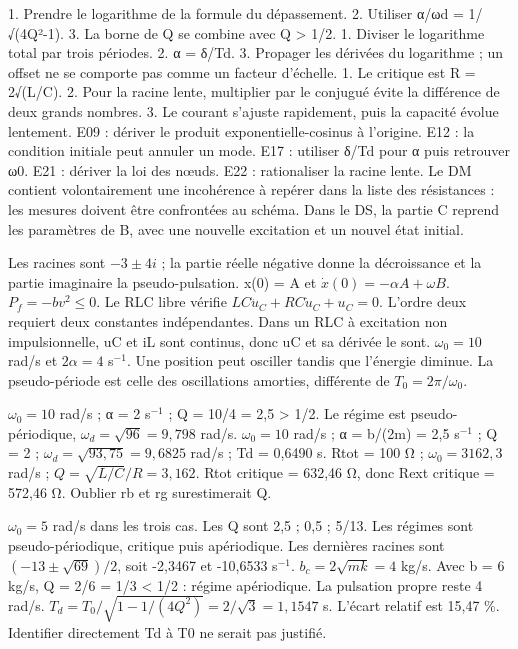 1. Prendre le logarithme de la formule du dépassement. 2. Utiliser α/ωd = 1/√(4Q²-1). 3. La borne de Q se combine avec Q > 1/2.
1. Diviser le logarithme total par trois périodes. 2. α = δ/Td. 3. Propager les dérivées du logarithme ; un offset ne se comporte pas comme un facteur d’échelle.
1. Le critique est R = 2√(L/C). 2. Pour la racine lente, multiplier par le conjugué évite la différence de deux grands nombres. 3. Le courant s’ajuste rapidement, puis la capacité évolue lentement.
E09 : dériver le produit exponentielle-cosinus à l’origine. E12 : la condition initiale peut annuler un mode. E17 : utiliser δ/Td pour α puis retrouver ω0. E21 : dériver la loi des nœuds. E22 : rationaliser la racine lente.
Le DM contient volontairement une incohérence à repérer dans la liste des résistances : les mesures doivent être confrontées au schéma. Dans le DS, la partie C reprend les paramètres de B, avec une nouvelle excitation et un nouvel état initial.


Les racines sont $-3\pm4i$ ; la partie réelle négative donne la décroissance et la partie imaginaire la pseudo-pulsation. x(0) = A et $\dot x(0)=-\alpha A+\omega B$.
$P_f=-bv^2\leq0$. Le RLC libre vérifie $LC\ddot u_C+RC\dot u_C+u_C=0$.
L’ordre deux requiert deux constantes indépendantes. Dans un RLC à excitation non impulsionnelle, uC et iL sont continus, donc uC et sa dérivée le sont. $\omega_0=10$ rad/s et $2\alpha=4$ s$^{-1}$. Une position peut osciller tandis que l’énergie diminue. La pseudo-période est celle des oscillations amorties, différente de $T_0=2\pi/\omega_0$.


$\omega_0=10$ rad/s ; α = 2 s$^{-1}$ ; Q = 10/4 = 2,5 > 1/2. Le régime est pseudo-périodique, $\omega_d=\sqrt{96}=9{,}798$ rad/s.
$\omega_0=10$ rad/s ; α = b/(2m) = 2,5 s$^{-1}$ ; Q = 2 ; $\omega_d=\sqrt{93{,}75}=9{,}6825$ rad/s ; Td = 0,6490 s.
Rtot = 100 Ω ; $\omega_0=3162{,}3$ rad/s ; $Q=\sqrt{L/C}/R=3{,}162$. Rtot critique = 632,46 Ω, donc Rext critique = 572,46 Ω. Oublier rb et rg surestimerait Q.


$\omega_0=5$ rad/s dans les trois cas. Les Q sont 2,5 ; 0,5 ; 5/13. Les régimes sont pseudo-périodique, critique puis apériodique. Les dernières racines sont $(-13\pm\sqrt{69})/2$, soit -2,3467 et -10,6533 s$^{-1}$.
$b_c=2\sqrt{mk}=4$ kg/s. Avec b = 6 kg/s, Q = 2/6 = 1/3 < 1/2 : régime apériodique. La pulsation propre reste 4 rad/s.
$T_d=T_0/\sqrt{1-1/(4Q^2)}=2/\sqrt3=1{,}1547$ s. L’écart relatif est 15,47 \%. Identifier directement Td à T0 ne serait pas justifié.


